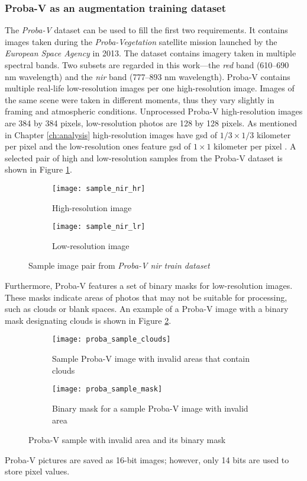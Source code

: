 \subsubsection{Proba-V as an augmentation training dataset}
\label{sec:probav}
The \textit{Proba-V} dataset \cite{esa-proba} can be used to fill the first two requirements.
It contains images taken during the \textit{Proba-Vegetation} satellite mission launched by the \textit{European Space Agency} in 2013.
The dataset contains imagery taken in multiple spectral bands.
Two subsets are regarded in this work---the \textit{\gls{red}} band (610--690 \si{\nano\meter} wavelength) and the \textit{\gls{nir}} band (777--893 \si{\nano\meter} wavelength).
Proba-V contains multiple real-life low-resolution images per one high-resolution image.
Images of the same scene were taken in different moments, thus they vary slightly in framing and atmospheric conditions.
Unprocessed Proba-V high-resolution images are 384 by 384 pixels, low-resolution photos are 128 by 128 pixels.
As mentioned in Chapter \ref{ch:analysis} high-resolution images have \gls{gsd} of $ 1/3 \times 1/3 $ kilometer per pixel and the low-resolution ones feature \gls{gsd} of $ 1 \times 1 $ kilometer per pixel \cite{direckx-2013-proba}.
A selected pair of high and low-resolution samples from the Proba-V dataset is shown in Figure \ref{fig:proba-sample}.
\begin{figure}[htb!]
    \begin{subfigure}{0.45\textwidth}
        \centering
        \texttt{[image: sample\_nir\_hr]}
        \caption{High-resolution image}
    \end{subfigure}
    \hfill
    \begin{subfigure}{0.45\textwidth}
        \centering
        \texttt{[image: sample\_nir\_lr]}
        \caption{Low-resolution image}
    \end{subfigure}
    \caption{Sample image pair from \textit{Proba-V \gls{nir} train dataset}}
    \label{fig:proba-sample}
\end{figure}
Furthermore, Proba-V features a set of binary masks for low-resolution images.
These masks indicate areas of photos that may not be suitable for processing, such as clouds or blank spaces.
An example of a Proba-V image with a binary mask designating clouds is shown in Figure \ref{fig:proba_sample_mask}.
\begin{figure}[htb!]
    \begin{subfigure}{0.45\textwidth}
        \centering
        \texttt{[image: proba\_sample\_clouds]}
        \caption{Sample Proba-V image with invalid areas that contain clouds}
    \end{subfigure}
    \hfill
    \begin{subfigure}{0.45\textwidth}
        \centering
        \texttt{[image: proba\_sample\_mask]}
        \caption{Binary mask for a sample Proba-V image with invalid area}
    \end{subfigure}
    \caption{Proba-V sample with invalid area and its binary mask}
    \label{fig:proba_sample_mask}
\end{figure}
Proba-V pictures are saved as 16-bit images; however, only 14 bits are used to store pixel values.

